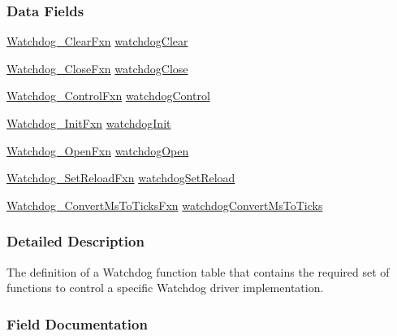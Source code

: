 \subsubsection*{Data Fields}
\begin{DoxyCompactItemize}
\item 
\hyperlink{_watchdog_8h_a0315c4931ba68423472f47c23c86f296}{Watchdog\+\_\+\+Clear\+Fxn} \hyperlink{struct_watchdog___fxn_table_a925066f771f1c4ad0e8607e8aa6aee4f}{watchdog\+Clear}
\item 
\hyperlink{_watchdog_8h_a2d13686bc3dd7fdb05ec97d63be489ee}{Watchdog\+\_\+\+Close\+Fxn} \hyperlink{struct_watchdog___fxn_table_a4e8c8b1da4a51c4b76d33e702637f326}{watchdog\+Close}
\item 
\hyperlink{_watchdog_8h_afb5bd0153345db8f4a7a6a8756b90447}{Watchdog\+\_\+\+Control\+Fxn} \hyperlink{struct_watchdog___fxn_table_a415d44b4771fd48395105c5644a14429}{watchdog\+Control}
\item 
\hyperlink{_watchdog_8h_a6401b1a23d9048efb4ed69a074ea60f9}{Watchdog\+\_\+\+Init\+Fxn} \hyperlink{struct_watchdog___fxn_table_a098c5fc8de0d3bf2071960387156c3a2}{watchdog\+Init}
\item 
\hyperlink{_watchdog_8h_a05ae778da809a34e4d84c95d35ba5f58}{Watchdog\+\_\+\+Open\+Fxn} \hyperlink{struct_watchdog___fxn_table_aaff59460698cbba41fca6660c44ee9c0}{watchdog\+Open}
\item 
\hyperlink{_watchdog_8h_aa81bae05dc1321bcc8ebcda8e9116f66}{Watchdog\+\_\+\+Set\+Reload\+Fxn} \hyperlink{struct_watchdog___fxn_table_aff9226f8aff3780cf4a05d3e0adf7ea4}{watchdog\+Set\+Reload}
\item 
\hyperlink{_watchdog_8h_aaf90926e5dc22cdca706b9aa86ee7580}{Watchdog\+\_\+\+Convert\+Ms\+To\+Ticks\+Fxn} \hyperlink{struct_watchdog___fxn_table_ab253c59bdf8e993393478369de95a038}{watchdog\+Convert\+Ms\+To\+Ticks}
\end{DoxyCompactItemize}


\subsubsection{Detailed Description}
The definition of a Watchdog function table that contains the required set of functions to control a specific Watchdog driver implementation. 

\subsubsection{Field Documentation}

